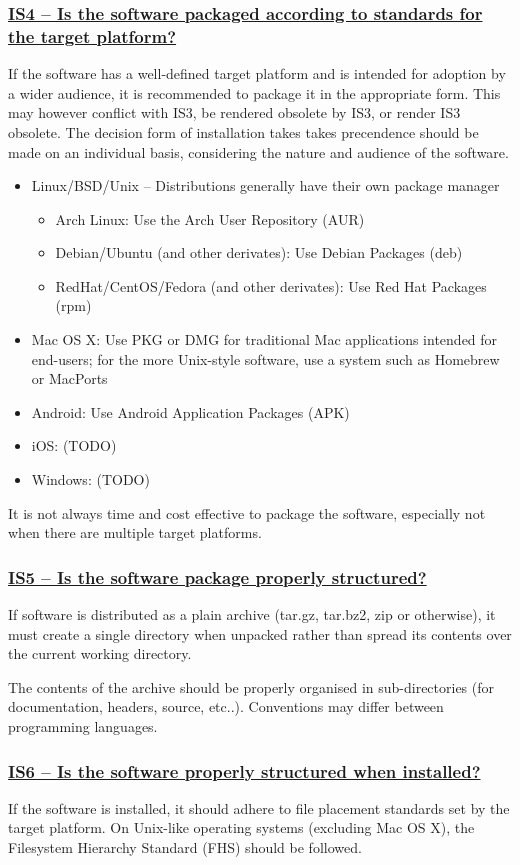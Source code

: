 \documentclass[a4paper,11pt]{article}
\newcommand{\criterion}[1]{\subsubsection*{\underline{#1}}}
\begin{document}
\criterion{IS4 -- Is the software packaged according to standards for the target platform?}

If the software has a well-defined target platform and is intended for adoption
by a wider audience, it is recommended to package it in the appropriate form.
This may however conflict with IS3, be rendered obsolete by IS3, or render IS3
obsolete. The decision form of installation takes takes precendence should be
made on an individual basis, considering the nature and audience of the
software.

\begin{itemize}
    \item Linux/BSD/Unix -- Distributions generally have their own package manager
    \begin{itemize}
        \item Arch Linux: Use the Arch User Repository (AUR)
        \item Debian/Ubuntu (and other derivates): Use Debian Packages (deb)
        \item RedHat/CentOS/Fedora (and other derivates): Use Red Hat Packages (rpm)
    \end{itemize}
    \item Mac OS X: Use PKG or DMG for traditional Mac applications intended for end-users; for the more Unix-style
        software, use a system such as Homebrew or MacPorts
    \item Android: Use Android Application Packages (APK)
    \item iOS: (TODO) 
    \item Windows: (TODO) 
\end{itemize}

It is not always time and cost effective to package the software, especially not
when there are multiple target platforms. 

\criterion{IS5 -- Is the software package properly structured?}

If software is distributed as a plain archive (tar.gz, tar.bz2, zip or otherwise),
it must create a single directory when unpacked rather than spread its contents
over the current working directory.

The contents of the archive should be properly organised in sub-directories
(for documentation, headers, source, etc..). Conventions may differ between
programming languages.

\criterion{IS6 -- Is the software properly structured when installed?}

If the software is installed, it should adhere to file placement standards set
by the target platform. On Unix-like operating systems (excluding Mac OS X), the Filesystem
Hierarchy Standard (FHS) should be followed.
\end{document}
